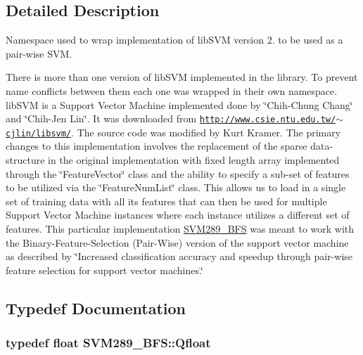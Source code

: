 \subsection{Detailed Description}
Namespace used to wrap implementation of lib\+S\+VM version 2. to be used as a pair-\/wise S\+VM. 

There is more than one version of lib\+S\+VM implemented in the library. To prevent name conflicts between them each one was wrapped in their own namespace. ~\newline
 lib\+S\+VM is a Support Vector Machine implemented done by \char`\"{}\+Chih-\/\+Chung Chang\char`\"{} and \char`\"{}\+Chih-\/\+Jen Lin\char`\"{}. It was downloaded from \href{http://www.csie.ntu.edu.tw/~cjlin/libsvm/}{\tt http\+://www.\+csie.\+ntu.\+edu.\+tw/$\sim$cjlin/libsvm/}. The source code was modified by Kurt Kramer. The primary changes to this implementation involves the replacement of the sparse data-\/structure in the original implementation with fixed length array implemented through the \char`\"{}\+Feature\+Vector\char`\"{} class and the ability to specify a sub-\/set of features to be utilized via the \char`\"{}\+Feature\+Num\+List\char`\"{} class. This allows us to load in a single set of training data with all its features that can then be used for multiple Support Vector Machine instances where each instance utilizes a different set of features. This particular implementation \hyperlink{namespace_s_v_m289___b_f_s}{S\+V\+M289\+\_\+\+B\+FS} was meant to work with the Binary-\/\+Feature-\/\+Selection (Pair-\/\+Wise) version of the support vector machine as described by \char`\"{}\+Increased classification accuracy and speedup through pair-\/wise feature selection for support vector machines.\char`\"{} 

\subsection{Typedef Documentation}
\subsubsection[{\texorpdfstring{Qfloat}{Qfloat}}]{\setlength{\rightskip}{0pt plus 5cm}typedef float {\bf S\+V\+M289\+\_\+\+B\+F\+S\+::\+Qfloat}}\hypertarget{namespace_s_v_m289___b_f_s_a8b0a7657dcefcb6e9a857c9b5e2fd2ef}{}\label{namespace_s_v_m289___b_f_s_a8b0a7657dcefcb6e9a857c9b5e2fd2ef}


